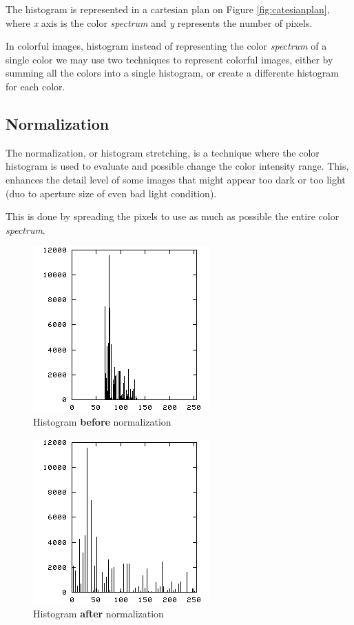\documentclass{article}
\begin{document}
		The histogram is represented in a cartesian plan on Figure \ref{fig:catesianplan}, where \textit{x} axis is the 
		color \textit{spectrum} and \textit{y} represents the number of pixels.

		In colorful images, histogram instead of representing the color \textit{spectrum} of a single color we may use two techniques
		to represent colorful images, either by summing all the colors into a single histogram, or create a differente histogram for each 
		color.
		

	\subsection{Normalization}
		
		The normalization, or histogram stretching, is a technique where the color histogram is used to evaluate and possible change
		the color intensity range. This, enhances the detail level of some images that might appear too dark or too light (duo to aperture size of even
		bad light condition).

		This is done by spreading the pixels to use as much as possible the entire color \textit{spectrum}.
		
		\begin{figure} [H]
			\centering
			\includegraphics[scale=0.5]{images/histogram_1}
			\caption{Histogram \textbf{before} normalization\label{histogram_1}}
		\end{figure}

		\begin{figure} [H]
			\centering
			\includegraphics[scale=0.5]{images/histogram_2}
			\caption{Histogram \textbf{after} normalization\label{histogram_2}}
		\end{figure}
\end{document}
